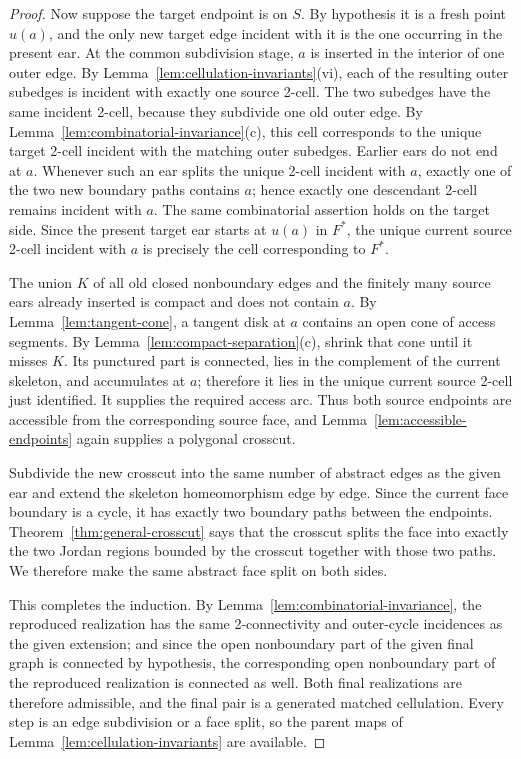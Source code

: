 \documentclass[11pt]{article}
\theoremstyle{mainplain}
\theoremstyle{mainroman}
\theoremstyle{definition}
\numberwithin{equation}{section}
\begin{document}
\begin{proof}
Now suppose the target endpoint is on \(S\). By hypothesis it is a
fresh point \(u(a)\), and the only new target edge incident with it is
the one occurring in the present ear. At the common subdivision stage,
$a$ is inserted in the interior of one outer edge. By
Lemma~\ref{lem:cellulation-invariants}\textup{(vi)}, each of the resulting
outer subedges is incident with exactly one source 2-cell. The two
subedges have the same incident 2-cell, because they subdivide one old
outer edge. By Lemma~\ref{lem:combinatorial-invariance}\textup{(c)}, this
cell corresponds to the unique target 2-cell incident with the matching
outer subedges. Earlier ears do not
end at $a$. Whenever such an ear splits the unique 2-cell incident with
$a$, exactly one of the two new boundary paths contains $a$; hence
exactly one descendant 2-cell remains incident with $a$. The same
combinatorial assertion holds on the target side. Since the present
target ear starts at $u(a)$ in $F^\ast$, the unique current source
2-cell incident with $a$ is precisely the cell corresponding to
$F^\ast$.

The union $K$ of all old closed nonboundary edges and the finitely many
source ears already inserted is compact and does not contain $a$.
By Lemma~\ref{lem:tangent-cone}, a tangent disk at $a$ contains an open
cone of access segments. By
Lemma~\ref{lem:compact-separation}\textup{(c)}, shrink that cone until it
misses $K$. Its punctured part is connected, lies
in the complement of the current skeleton, and accumulates at $a$;
therefore it lies in the unique current source 2-cell just identified.
It supplies the required access arc. Thus both source endpoints are
accessible from the corresponding source face, and
Lemma~\ref{lem:accessible-endpoints} again supplies a polygonal crosscut.

Subdivide the new crosscut into the same number of abstract edges as the given ear and extend the skeleton homeomorphism edge by edge. Since the current face boundary is a cycle, it has exactly two boundary paths between the endpoints. Theorem~\ref{thm:general-crosscut} says that the crosscut splits the face into exactly the two Jordan regions bounded by the crosscut together with those two paths. We therefore make the same abstract face split on both sides.

This completes the induction. By Lemma~\ref{lem:combinatorial-invariance}, the reproduced realization has the same 2-connectivity and outer-cycle incidences as the given extension; and since the open nonboundary part of the given final graph is connected by hypothesis, the corresponding open nonboundary part of the reproduced realization is connected as well. Both final realizations are therefore admissible, and the final pair is a generated matched cellulation. Every step is an edge subdivision or a face split, so the parent maps of Lemma~\ref{lem:cellulation-invariants} are available. \end{proof}
\end{document}

